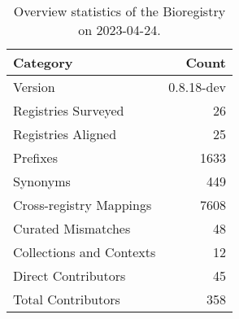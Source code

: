 \begin{table}
\caption{Overview statistics of the Bioregistry on 2023-04-24.}
\label{tab:bioregistry-summary}
\begin{tabular}{lr}
\toprule
Category & Count \\
\midrule
Version & 0.8.18-dev \\
Registries Surveyed & 26 \\
Registries Aligned & 25 \\
Prefixes & 1633 \\
Synonyms & 449 \\
Cross-registry Mappings & 7608 \\
Curated Mismatches & 48 \\
Collections and Contexts & 12 \\
Direct Contributors & 45 \\
Total Contributors & 358 \\
\bottomrule
\end{tabular}
\end{table}
